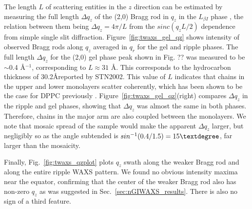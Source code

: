 The length $L$ of scattering entities in the $z$ direction can be estimated by 
measuring the full length $\Delta q_z$ of the (2,0) Bragg rod in $q_z$ in
the $L_{\beta I}$ phase \cite{ref:Tristram93},
the relation between them being $\Delta q_z = 4\pi/L$ from the $sinc(q_zL/2)$ dependence 
from simple single slit diffraction. 
Figure~\ref{fig:twaxs_gel_qz} shows intensity of observed Bragg rods along $q_z$ averaged in $q_r$
for the gel and ripple phases. The full length $\Delta q_z$ for the (2,0) gel
phase peak {\jn shown in Fig. ??} was measured to be $\sim$0.4 \AA$^{-1}$, corresponding to 
$L \approx 31$ \AA. {\jn This corresponds to the hydrocarbon thickness of 30.2\AA  reported by STN2002}. This value of $L$ indicates that chains in the upper and
lower monolayers scatter coherently, which has been shown to be the case
for DPPC previously \cite{ref:Tristram93}.
Figure~\ref{fig:twaxs_gel_qz}(right) compares $\Delta q_z$ in the ripple and gel phases,
showing that $\Delta q_z$ was almost the same in both phases. Therefore, 
chains in the major arm are also coupled between the monolayers. 
{\jn We note that mosaic spread of the sample would make the apparent $\Delta q_z$ 
larger, but negligibly so as the angle subtended is $sin^{-1}(0.4/1.5)=15\textdegree$, far larger than the
mosaicity.} 

Finally, Fig.~\ref{fig:twaxs_qzplot} plots $q_z$ swath along the weaker 
Bragg rod and along the entire ripple WAXS pattern. 
We found no obvious intensity maxima
near the equator, confirming that the center of the weaker Bragg rod also has non-zero
$q_z$ as was suggested in Sec.~\ref{sec:nGIWAXS_results}.
There is also no sign of a third feature.


